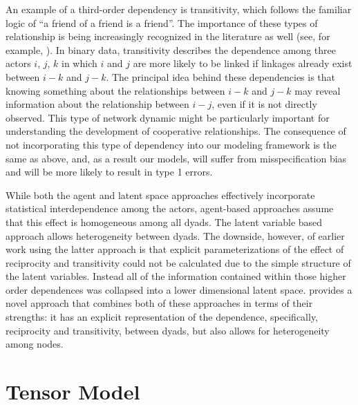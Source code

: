 \documentclass[3p,times,twocolumn,authoryear,12pt]{elsarticle}
\begin{document}
An example of a third-order dependency is transitivity, which follows the familiar logic of ``a friend of a friend is a friend''. The importance of these types of relationship is being increasingly recognized in the literature as well (see, for example, \citealp{lai:1995,manger:etal:2012,kinne:2013}). In binary data, transitivity describes the dependence among three actors $i$, $j$, $k$ in which $i$ and $j$ are more likely to be linked if linkages already exist between $i - k$ and $j - k$. The principal idea behind these dependencies is that knowing something about the relationships between $i-k$ and $j-k$ may reveal information about the relationship between $i-j$, even if it is not directly observed. This type of network dynamic might be particularly important for understanding the development of cooperative relationships. The consequence of not incorporating this type of dependency into our modeling framework is the same as above, and, as a result our models, will suffer from misspecification bias and will be more likely to result in type 1 errors. 

While both the agent and latent space approaches effectively incorporate statistical interdependence among the actors,  agent-based approaches assume that this effect is homogeneous among all dyads. The latent variable based approach allows heterogeneity between dyads. The downside, however, of earlier work using the latter approach is that explicit parameterizations of the effect of reciprocity and transitivity could not be calculated due to the simple structure of the latent variables. Instead all of the information contained within those higher order dependences was collapsed into a lower dimensional latent space. \citet{hoff:2014} provides a novel approach that combines both of these approaches in terms of their strengths: it has an explicit representation of the dependence, specifically, reciprocity and transitivity, between dyads, but also allows for heterogeneity among nodes.

\section{Tensor Model}
\end{document}
